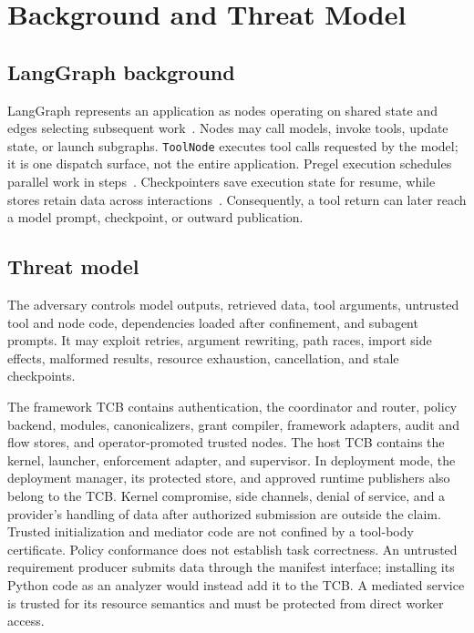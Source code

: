 \documentclass[letterpaper,twocolumn,10pt]{article}
\newcommand{\code}[1]{\texttt{#1}}
\begin{document}
\section{Background and Threat Model}
\label{sec:background}
\label{sec:model}

\subsection{LangGraph background}

LangGraph represents an application as nodes operating on shared state and
edges selecting subsequent work~\cite{langgraphapi}. Nodes may call models,
invoke tools, update state, or launch subgraphs. \code{ToolNode} executes tool
calls requested by the model; it is one dispatch surface, not the entire
application. Pregel execution schedules parallel work in steps~\cite{langgraphpregel}.
Checkpointers save
execution state for resume, while stores retain data across
interactions~\cite{langgraphpersistence}. Consequently, a tool return can later
reach a model prompt, checkpoint, or outward publication.

\subsection{Threat model}

The adversary controls model outputs, retrieved data, tool arguments, untrusted
tool and node code, dependencies loaded after confinement, and subagent prompts.
It may exploit retries, argument rewriting, path races, import side effects,
malformed results, resource exhaustion, cancellation, and stale checkpoints.

The framework TCB contains authentication, the coordinator and router, policy
backend, modules, canonicalizers, grant compiler, framework adapters, audit and
flow stores, and operator-promoted trusted nodes. The host TCB contains the
kernel, launcher, enforcement adapter, and supervisor. In deployment mode, the
deployment manager, its protected store, and approved runtime publishers also
belong to the TCB. Kernel compromise, side
channels, denial of service, and a provider's handling of data after authorized
submission are outside the claim. Trusted initialization and mediator code are
not confined by a tool-body certificate. Policy conformance does not establish
task correctness. An untrusted requirement producer submits data through the manifest
interface; installing its Python code as an analyzer would instead add it to
the TCB. A mediated service is trusted for its resource semantics and must be
protected from direct worker access.
\end{document}
